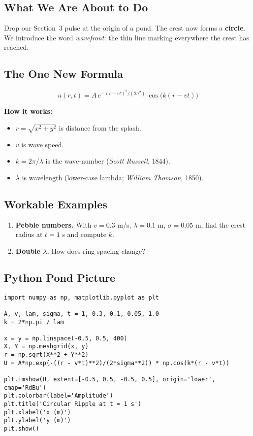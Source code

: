 \documentclass[12pt]{article}
\begin{document}
\subsection*{What We Are About to Do}
Drop our Section~3 pulse at the origin of a pond. The crest now forms a \textbf{circle}. We introduce the word \emph{wavefront}: the thin line marking everywhere the crest has reached.

\subsection*{The One New Formula}
\begin{equation}
  u(r,t)=A\,e^{-(r-vt)^{2}/(2\sigma^{2})}\,\cos\bigl(k(r-vt)\bigr)
\end{equation}

\textbf{How it works:}
\begin{itemize}
  \item \(r=\sqrt{x^{2}+y^{2}}\) is distance from the splash.
  \item \(v\) is wave speed.
  \item \(k=2\pi/\lambda\) is the wave-number (\textit{Scott Russell}, 1844).
  \item \(\lambda\) is wavelength (lower-case lambda; \textit{William Thomson}, 1850).
\end{itemize}

\subsection*{Workable Examples}
\begin{enumerate}
  \item \textbf{Pebble numbers.}  With \(v=0.3\) m/s, \(\lambda=0.1\) m, \(\sigma=0.05\) m, find the crest radius at \(t=1\) s and compute \(k\).
  \item \textbf{Double \(\lambda\).}  How does ring spacing change?
\end{enumerate}

\subsection*{Python Pond Picture}
\begin{lstlisting}[caption=Circular ripple,label=lst:pond]
import numpy as np, matplotlib.pyplot as plt

A, v, lam, sigma, t = 1, 0.3, 0.1, 0.05, 1.0
k = 2*np.pi / lam

x = y = np.linspace(-0.5, 0.5, 400)
X, Y = np.meshgrid(x, y)
r = np.sqrt(X**2 + Y**2)
U = A*np.exp(-((r - v*t)**2)/(2*sigma**2)) * np.cos(k*(r - v*t))

plt.imshow(U, extent=[-0.5, 0.5, -0.5, 0.5], origin='lower', cmap='RdBu')
plt.colorbar(label='Amplitude')
plt.title('Circular Ripple at t = 1 s')
plt.xlabel('x (m)')
plt.ylabel('y (m)')
plt.show()
\end{lstlisting}
\end{document}
